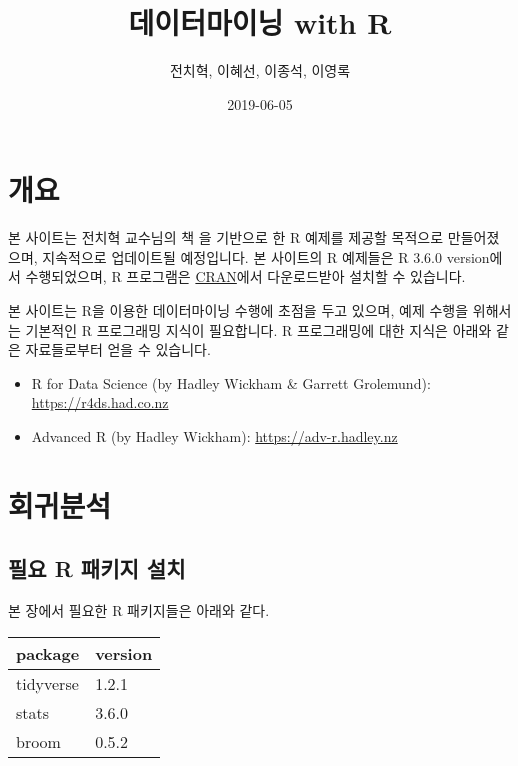 \documentclass[]{book}
\title{데이터마이닝 with R}
\author{전치혁, 이혜선, 이종석, 이영록}
\date{2019-06-05}
\providecommand{\tightlist}{%
  \setlength{\itemsep}{0pt}\setlength{\parskip}{0pt}}
\begin{document}
\maketitle

{
\setcounter{tocdepth}{1}
\tableofcontents
}
\chapter*{개요}

본 사이트는 전치혁 교수님의 책 \href{http://www.hannarae.net/books/area.php?ptype=view\&prdcode=1409250010}{}을 기반으로 한 R 예제를 제공할 목적으로 만들어졌으며, 지속적으로 업데이트될 예정입니다. 본 사이트의 R 예제들은 R 3.6.0 version에서 수행되었으며, R 프로그램은 \href{https://cran.r-project.org}{CRAN}에서 다운로드받아 설치할 수 있습니다.

본 사이트는 R을 이용한 데이터마이닝 수행에 초점을 두고 있으며, 예제 수행을 위해서는 기본적인 R 프로그래밍 지식이 필요합니다. R 프로그래밍에 대한 지식은 아래와 같은 자료들로부터 얻을 수 있습니다.

\begin{itemize}
\tightlist
\item
  R for Data Science (by Hadley Wickham \& Garrett Grolemund): \url{https://r4ds.had.co.nz}
\item
  Advanced R (by Hadley Wickham): \url{https://adv-r.hadley.nz}
\end{itemize}

\hypertarget{regression}{%
\chapter{회귀분석}\label{regression}}

\hypertarget{regression-packages-install}{%
\section{필요 R 패키지 설치}\label{regression-packages-install}}

본 장에서 필요한 R 패키지들은 아래와 같다.

\begin{tabular}{l|l}
\hline
package & version\\
\hline
tidyverse & 1.2.1\\
\hline
stats & 3.6.0\\
\hline
broom & 0.5.2\\
\hline
\end{tabular}
\end{document}
